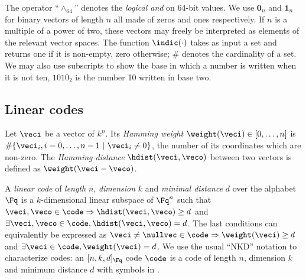 The operator ``$\wedge_{64}$'' denotes the  \emph{logical and} on 64-bit values. We use $\mathbf{0}_{n}$ and $\mathbf{1}_n$ for binary vectors of length $n$ all made of
zeros and ones respectively. If $n$ is a multiple of a power of two, these vectors may freely be interpreted as elements of the relevant vector spaces.
The function $\indic(\cdot)$ takes as input a set and returns one if it is non-empty, zero otherwise; $\#$ denotes the cardinality of a set.
We may also use subscripts to show the base in which a number is written when it is not ten, \eg $1010_2$ is the number 10 written in base two.



\subsection{Linear codes}

\begin{defi}
Let $\veci$ be a vector of $k^n$. Its \emph{Hamming weight} $\weight(\veci) \in [0,\ldots,n]$ is $\#\{\veci_i, i = 0,\ldots,n-1~|~ \veci_i \neq 0\}$,
the number of its coordinates which are non-zero.
The \emph{Hamming distance} $\hdist(\veci,\veco)$ between two vectors is defined as $\weight(\veci - \veco)$.
\end{defi}


\begin{defi}
\label{def:lincode}
A \emph{linear code} of \emph{length} $n$, \emph{dimension} $k$ and \emph{minimal distance} $d$ over the alphabet $\Fq$ is a $k$-dimensional linear subspace of $\Fq^n$ such that $\veci, \veco \in \code \Rightarrow \hdist(\veci, \veco) \geq d$
and $\exists \veci, \veco \in \code,  \hdist(\veci, \veco) = d$.
The last conditions can equivalently be expressed as $\veci \neq \nullvec \in \code \Rightarrow \weight(\veci) \geq d$ and $\exists \veci \in \code, \weight(\veci) = d$.
We use the usual ``NKD'' notation to characterize codes: an $[n, k, d]_{\Fq}$ code $\code$ is a code of length $n$, dimension $k$ and minimum distance $d$
with symbols in \Fq.
\end{defi}

